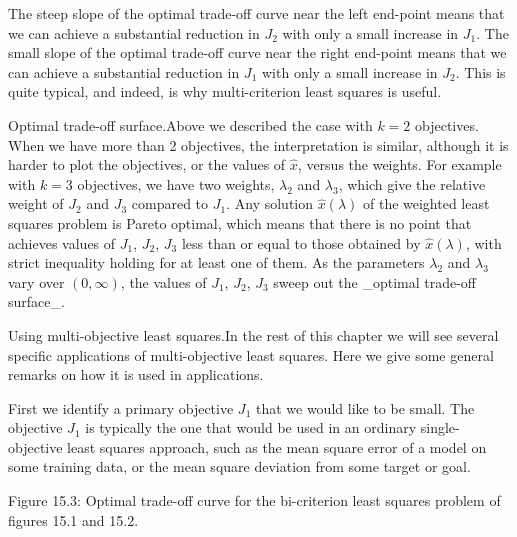 The steep slope of the optimal trade-off curve near the left end-point means that we can achieve a substantial reduction in \(J_{2}\) with only a small increase in \(J_{1}\). The small slope of the optimal trade-off curve near the right end-point means that we can achieve a substantial reduction in \(J_{1}\) with only a small increase in \(J_{2}\). This is quite typical, and indeed, is why multi-criterion least squares is useful.

Optimal trade-off surface.Above we described the case with \(k=2\) objectives. When we have more than 2 objectives, the interpretation is similar, although it is harder to plot the objectives, or the values of \(\hat{x}\), versus the weights. For example with \(k=3\) objectives, we have two weights, \(\lambda_{2}\) and \(\lambda_{3}\), which give the relative weight of \(J_{2}\) and \(J_{3}\) compared to \(J_{1}\). Any solution \(\hat{x}(\lambda)\) of the weighted least squares problem is Pareto optimal, which means that there is no point that achieves values of \(J_{1}\), \(J_{2}\), \(J_{3}\) less than or equal to those obtained by \(\hat{x}(\lambda)\), with strict inequality holding for at least one of them. As the parameters \(\lambda_{2}\) and \(\lambda_{3}\) vary over \((0,\infty)\), the values of \(J_{1}\), \(J_{2}\), \(J_{3}\) sweep out the _optimal trade-off surface_.

Using multi-objective least squares.In the rest of this chapter we will see several specific applications of multi-objective least squares. Here we give some general remarks on how it is used in applications.

First we identify a primary objective \(J_{1}\) that we would like to be small. The objective \(J_{1}\) is typically the one that would be used in an ordinary single-objective least squares approach, such as the mean square error of a model on some training data, or the mean square deviation from some target or goal.

Figure 15.3: Optimal trade-off curve for the bi-criterion least squares problem of figures 15.1 and 15.2.

 
